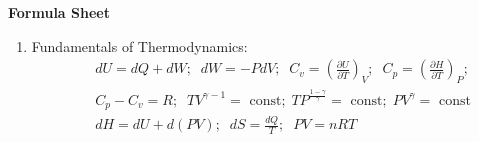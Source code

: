 \documentclass[12pts,a4paper,amsmath,amssymb,floatfix]{article}%
\newcommand{\frc}{\displaystyle\frac}
\newcommand{\Partial}[3][error]{\left(\frc{\partial #1}{\partial #2}\right)_{#3}}
\begin{document}
\clearpage
     
\begin{center}
  {\Large {\bf Formula Sheet}}
\end{center}


\begin{enumerate}[1)]
\item Fundamentals of Thermodynamics:
  \begin{eqnarray}
    && dU = dQ + dW;\;\;dW = -PdV;\;\; C_{v}=\Partial[U]{T}{V};\;\;C_{p} = \Partial[H]{T}{P};\nonumber \\
    && C_{p}-C_{v} = R;\;\; TV^{\gamma-1} =\text{ const};\; TP^{\frac{1-\gamma}{\gamma}}=\text{ const};\; PV^{\gamma}=\text{ const} \nonumber \\
    && dH = dU + d(PV);\;\; dS = \frc{dQ}{T};\;\; PV = nRT \nonumber
  \end{eqnarray}
  

\end{enumerate}
\end{document}
